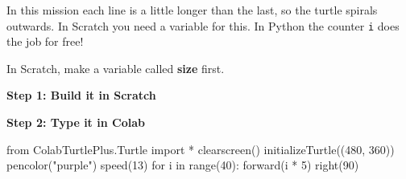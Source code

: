 In this mission each line is a little longer than the last, so the turtle spirals outwards. In Scratch you need a variable for this. In Python the counter \texttt{i} does the job for free!

In Scratch, make a variable called \textbf{size} first.

\begin{tcbraster}[raster columns=2, raster column skip=12pt, raster valign=top, raster force size=false,
  raster column 1/.style={add to width=-2.4cm}, raster column 2/.style={add to width=2.4cm}]
\begin{tcolorbox}[blankest]{\large\bfseries\color{ink}Step 1: Build it in Scratch}\end{tcolorbox}
\begin{tcolorbox}[blankest]{\large\bfseries\color{ink}Step 2: Type it in Colab}\end{tcolorbox}
\begin{tcolorbox}[blankest]
\begin{scratch}[scale=0.75]
\end{scratch}
\end{tcolorbox}
\begin{typethis}
from ColabTurtlePlus.Turtle import *
clearscreen()
initializeTurtle((480, 360))
pencolor("purple")
speed(13)
for i in range(40):
    forward(i * 5)
    right(90)
\end{typethis}
\end{tcbraster}


